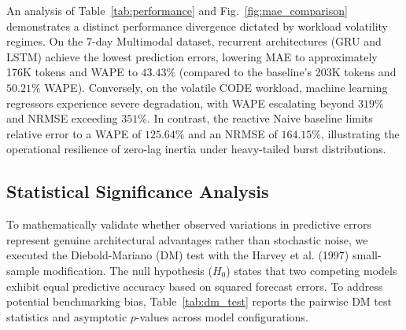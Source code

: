 \documentclass[conference, a4paper]{IEEEtran}
\begin{document}
An analysis of Table~\ref{tab:performance} and Fig.~\ref{fig:mae_comparison} demonstrates a distinct performance divergence dictated by workload volatility regimes. On the 7-day Multimodal dataset, recurrent architectures (GRU and LSTM) achieve the lowest prediction errors, lowering MAE to approximately 176K tokens and WAPE to $43.43\%$ (compared to the baseline's 203K tokens and $50.21\%$ WAPE). Conversely, on the volatile CODE workload, machine learning regressors experience severe degradation, with WAPE escalating beyond $319\%$ and NRMSE exceeding $351\%$. In contrast, the reactive Naive baseline limits relative error to a WAPE of $125.64\%$ and an NRMSE of $164.15\%$, illustrating the operational resilience of zero-lag inertia under heavy-tailed burst distributions.


\subsection{Statistical Significance Analysis}
To mathematically validate whether observed variations in predictive errors represent genuine architectural advantages rather than stochastic noise, we executed the Diebold-Mariano (DM) test with the Harvey et al. (1997) small-sample modification. The null hypothesis ($H_0$) states that two competing models exhibit equal predictive accuracy based on squared forecast errors. To address potential benchmarking bias, Table~\ref{tab:dm_test} reports the pairwise DM test statistics and asymptotic $p$-values across model configurations.
\end{document}
